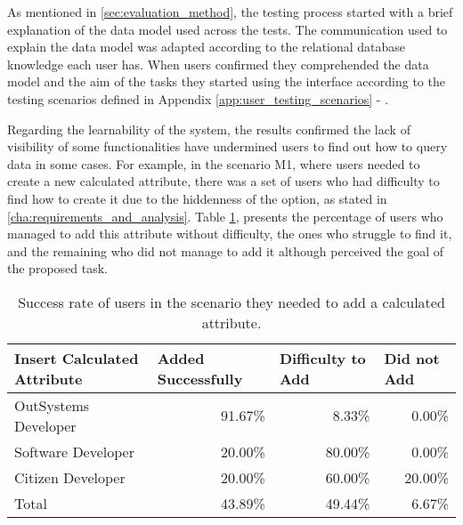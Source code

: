 As mentioned in \ref{sec:evaluation_method}, the testing process started with a brief explanation of the data model used across the tests. The communication used to explain the data model was adapted according to the relational database knowledge each user has. When users confirmed they comprehended the data model and the aim of the tasks they started using the interface according to the testing scenarios defined in Appendix \ref{app:user_testing_scenarios} - .

Regarding the learnability of the system, the results confirmed the lack of visibility of some functionalities have undermined users to find out how to query data in some cases. For example, in the scenario M1, where users needed to create a new calculated attribute, there was a set of users who had difficulty to find how to create it due to the hiddenness of the option, as stated in \ref{cha:requirements_and_analysis}. Table \ref{tab:existingInterfaceCalculatedAttribute}, presents the percentage of users who managed to add this attribute without difficulty, the ones who struggle to find it, and the remaining who did not manage to add it although perceived the goal of the proposed task.

\begin{table}[tb]
    \caption{Success rate of users in the scenario they needed to add a calculated attribute.}
    \label{tab:existingInterfaceCalculatedAttribute}
    \begin{tabular}{@{}lrrr@{}}
    \toprule
    \textbf{Insert Calculated Attribute} & \multicolumn{1}{l}{Added Successfully} & \multicolumn{1}{l}{Difficulty to Add} & \multicolumn{1}{l}{Did not Add} \\ \midrule
    OutSystems Developer                 & 91.67\%                                & 8.33\%                                & 0.00\%                          \\
    Software Developer                   & 20.00\%                                & 80.00\%                               & 0.00\%                          \\
    Citizen Developer                    & 20.00\%                                & 60.00\%                               & 20.00\%                         \\
    Total                                & 43.89\%                                & 49.44\%                               & 6.67\%                          \\ \bottomrule
    \end{tabular}
    \end{table}

